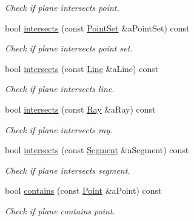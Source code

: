 \begin{DoxyCompactItemize}
\begin{DoxyCompactList}\small\item\em Check if plane intersects point. \end{DoxyCompactList}\item 
bool \hyperlink{classostk_1_1math_1_1geom_1_1d3_1_1objects_1_1_plane_a3545f1d49c58ecf570420461242e3545}{intersects} (const \hyperlink{classostk_1_1math_1_1geom_1_1d3_1_1objects_1_1_point_set}{Point\+Set} \&a\+Point\+Set) const
\begin{DoxyCompactList}\small\item\em Check if plane intersects point set. \end{DoxyCompactList}\item 
bool \hyperlink{classostk_1_1math_1_1geom_1_1d3_1_1objects_1_1_plane_a91bfde1cfff958833f3df94c70c37bcc}{intersects} (const \hyperlink{classostk_1_1math_1_1geom_1_1d3_1_1objects_1_1_line}{Line} \&a\+Line) const
\begin{DoxyCompactList}\small\item\em Check if plane intersects line. \end{DoxyCompactList}\item 
bool \hyperlink{classostk_1_1math_1_1geom_1_1d3_1_1objects_1_1_plane_af1e179dece2fbba1482fdd9a98fc58ea}{intersects} (const \hyperlink{classostk_1_1math_1_1geom_1_1d3_1_1objects_1_1_ray}{Ray} \&a\+Ray) const
\begin{DoxyCompactList}\small\item\em Check if plane intersects ray. \end{DoxyCompactList}\item 
bool \hyperlink{classostk_1_1math_1_1geom_1_1d3_1_1objects_1_1_plane_a7b1d164ebd925ed9329479f9f522c7f9}{intersects} (const \hyperlink{classostk_1_1math_1_1geom_1_1d3_1_1objects_1_1_segment}{Segment} \&a\+Segment) const
\begin{DoxyCompactList}\small\item\em Check if plane intersects segment. \end{DoxyCompactList}\item 
bool \hyperlink{classostk_1_1math_1_1geom_1_1d3_1_1objects_1_1_plane_a62deb80d18f6c9c86a5765a20e91d490}{contains} (const \hyperlink{classostk_1_1math_1_1geom_1_1d3_1_1objects_1_1_point}{Point} \&a\+Point) const
\begin{DoxyCompactList}\small\item\em Check if plane contains point. \end{DoxyCompactList}\item 

\end{DoxyCompactItemize}
